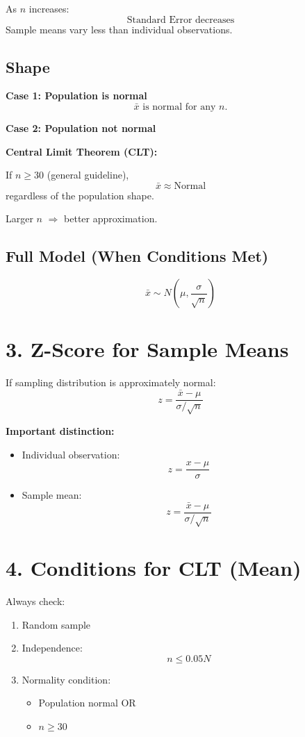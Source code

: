 \documentclass{article}
\begin{document}
As $n$ increases:
\[
\text{Standard Error decreases}
\]
Sample means vary less than individual observations.

\subsection*{Shape}

\textbf{Case 1: Population is normal}  
\[
\bar{x} \text{ is normal for any } n.
\]

\textbf{Case 2: Population not normal}

\textbf{Central Limit Theorem (CLT):}

If $n \ge 30$ (general guideline),
\[
\bar{x} \approx \text{Normal}
\]
regardless of the population shape.

Larger $n$ $\Rightarrow$ better approximation.

\subsection*{Full Model (When Conditions Met)}
\[
\bar{x} \sim N\left(\mu, \frac{\sigma}{\sqrt{n}}\right)
\]

\bigskip

\section*{3. Z-Score for Sample Means}

If sampling distribution is approximately normal:
\[
z = \frac{\bar{x} - \mu}{\sigma/\sqrt{n}}
\]

\textbf{Important distinction:}

\begin{itemize}
\item Individual observation:
\[
z = \frac{x - \mu}{\sigma}
\]
\item Sample mean:
\[
z = \frac{\bar{x} - \mu}{\sigma/\sqrt{n}}
\]
\end{itemize}

\bigskip

\section*{4. Conditions for CLT (Mean)}

Always check:

\begin{enumerate}
\item Random sample
\item Independence:
\[
n \le 0.05N
\]
\item Normality condition:
\begin{itemize}
\item Population normal OR
\item $n \ge 30$
\end{itemize}
\end{enumerate}
\end{document}
